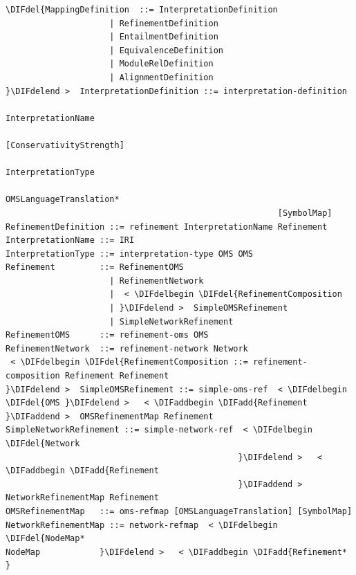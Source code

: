\documentclass[10pt,fleqn,final]{scrreprt}
\newenvironment{definitions}[0]{\medskip }{}
\providecommand{\DIFadd}[1]{{\protect\color{blue}\uwave{#1}}} %
\providecommand{\DIFdel}[1]{{\protect\color{red}\sout{#1}}}                      %
\providecommand{\DIFaddbegin}{} %
\providecommand{\DIFaddend}{} %
\providecommand{\DIFdelbegin}{} %
\providecommand{\DIFdelend}{} %
\begin{document}
\begin{definitions}
\begin{lstlisting}[language=ebnf,escapeinside={<>},mathescape]
%DIFDELCMD < %%%
\DIFdel{MappingDefinition  ::= InterpretationDefinition
                     | RefinementDefinition
                     | EntailmentDefinition
                     | EquivalenceDefinition
                     | ModuleRelDefinition
                     | AlignmentDefinition
}\DIFdelend >  InterpretationDefinition ::= interpretation-definition
                                                       InterpretationName
                                                       [ConservativityStrength]
                                                       InterpretationType
                                                       OMSLanguageTranslation*
                                                       [SymbolMap]
RefinementDefinition ::= refinement InterpretationName Refinement
InterpretationName ::= IRI
InterpretationType ::= interpretation-type OMS OMS
Refinement         ::= RefinementOMS
                     | RefinementNetwork
                     |  < \DIFdelbegin \DIFdel{RefinementComposition
                     | }\DIFdelend >  SimpleOMSRefinement
                     | SimpleNetworkRefinement
RefinementOMS      ::= refinement-oms OMS
RefinementNetwork  ::= refinement-network Network
 < \DIFdelbegin \DIFdel{RefinementComposition ::= refinement-composition Refinement Refinement
}\DIFdelend >  SimpleOMSRefinement ::= simple-oms-ref  < \DIFdelbegin \DIFdel{OMS }\DIFdelend >   < \DIFaddbegin \DIFadd{Refinement }\DIFaddend >  OMSRefinementMap Refinement
SimpleNetworkRefinement ::= simple-network-ref  < \DIFdelbegin \DIFdel{Network
                                               }\DIFdelend >   < \DIFaddbegin \DIFadd{Refinement
                                               }\DIFaddend >  NetworkRefinementMap Refinement
OMSRefinementMap   ::= oms-refmap [OMSLanguageTranslation] [SymbolMap]
NetworkRefinementMap ::= network-refmap  < \DIFdelbegin \DIFdel{NodeMap*
NodeMap            }\DIFdelend >   < \DIFaddbegin \DIFadd{Refinement*
}\end{lstlisting}


\end{definitions}
\end{document}

